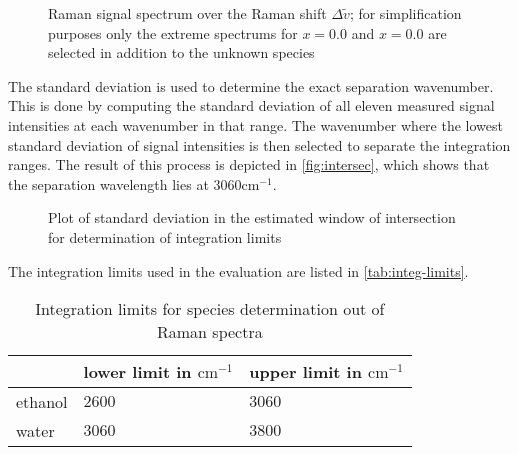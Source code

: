 \begin{figure}[!htb]
    \centering
    
    \caption[Plot of Raman signal spectra over Raman shift]{Raman signal spectrum over the Raman shift $\Delta \tilde{v}$; for simplification purposes only the extreme spectrums for $x=0.0$ and $x=0.0$ are selected in addition to the unknown species}
    \label{fig:spectra}
\end{figure}

The standard deviation is used to determine the exact separation wavenumber. This is done by computing the standard deviation of all eleven measured signal intensities at each wavenumber in that range. The wavenumber where the lowest standard deviation of signal intensities is then selected to separate the integration ranges. The result of this process is depicted in \autoref{fig:intersec}, which shows that the separation wavelength lies at $3060 \mathrm{cm^{-1}}$.

\begin{figure}[!htb]
    \centering
    
    \caption[Determination of the species spectra intersection point]{Plot of standard deviation in the estimated window of intersection for determination of integration limits}
    \label{fig:intersec}
\end{figure}

The integration limits used in the evaluation are listed in \autoref{tab:integ-limits}.

\begin{table}[!htb]
    \centering
    \caption{Integration limits for species determination out of Raman spectra}
    \label{tab:integ-limits}
    \vspace{12pt}
    \begin{tabular}{|l|l|l|}
        \cline{2-3}
        \multicolumn{1}{l|}{} & lower limit in $\mathrm{cm^{-1}}$ & upper limit in $\mathrm{cm^{-1}}$ \\ \hline
        ethanol & $2600$ & $3060$ \\ \hline
        water & $3060$ & $3800$ \\ \hline
    \end{tabular}
\end{table}


